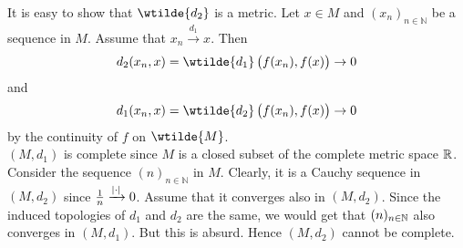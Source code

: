 \begin{enumerate}[label = \textbf{Exercise \arabic*.},wide = 0pt, itemsep=1.5ex]
\begin{enumerate}[label = \textbf{\alph*.},wide = 0pt, itemsep=1.5ex]
		It is easy to show that $\wtilde{d_2}$ is a metric. Let $x \in M$ and $(x_n)_{n \in \mathbb{N}}$ be a sequence in $M$. Assume that $x_n \xrightarrow{d_1}{} x$. Then 
		\begin{equation*}
			d_2(x_n,x) = \wtilde{d_1}\del[1]{f(x_n),f(x)} \to 0
		\end{equation*}
		\noindent and
		\begin{equation*}
			d_1(x_n,x) = \wtilde{d_2}\del[1]{f(x_n),f(x)} \to  0
		\end{equation*}
		\noindent by the continuity of $f$ on $\wtilde{M}$.\\
		$(M,d_1)$ is complete since $M$ is a closed subset of the complete metric space $\mathbb{R}$. Consider the sequence $(n)_{n \in \mathbb{N}}$ in $M$. Clearly, it is a Cauchy sequence in $(M,d_2)$ since $\frac{1}{n} \xrightarrow{\abs[0]{\cdot}}{} 0$. Assume that it converges also in $(M,d_2)$. Since the induced topologies of $d_1$ and $d_2$ are the same, we would get that $(n)_{n \in \mathbb{N}}$ also converges in $(M,d_1)$. But this is absurd. Hence $(M,d_2)$ cannot be complete. 
	\end{enumerate}
\end{enumerate}
\printbibliography


